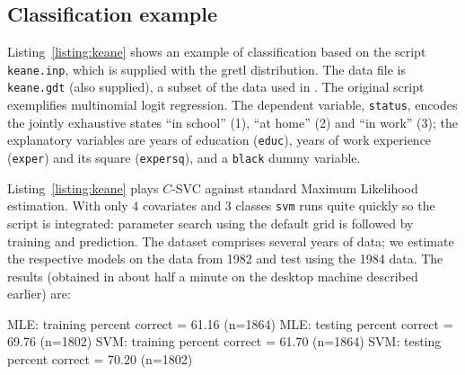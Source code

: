 \documentclass{article}
\begin{document}
\subsection{Classification example}
\label{sec:SVC-example}

Listing~\ref{listing:keane} shows an example of classification based
on the script \texttt{keane.inp}, which is supplied with the gretl
distribution. The data file is \texttt{keane.gdt} (also supplied), a
subset of the data used in \cite{keane97}. The original script
exemplifies multinomial logit regression. The dependent variable,
\texttt{status}, encodes the jointly exhaustive states ``in school''
(1), ``at home'' (2) and ``in work'' (3); the explanatory variables
are years of education (\texttt{educ}), years of work experience
(\texttt{exper}) and its square (\texttt{expersq}), and a
\texttt{black} dummy variable.

Listing~\ref{listing:keane} plays $C$-SVC against standard Maximum
Likelihood estimation. With only 4 covariates and 3 classes
\texttt{svm} runs quite quickly so the script is integrated: parameter
search using the default grid is followed by training and
prediction. The dataset comprises several years of data; we estimate
the respective models on the data from 1982 and test using the 1984
data. The results (obtained in about half a minute on the desktop
machine described earlier) are:
\begin{code}
MLE: training percent correct = 61.16 (n=1864)
MLE: testing percent correct  = 69.76 (n=1802)
SVM: training percent correct = 61.70 (n=1864)
SVM: testing percent correct  = 70.20 (n=1802)
\end{code}
\end{document}
